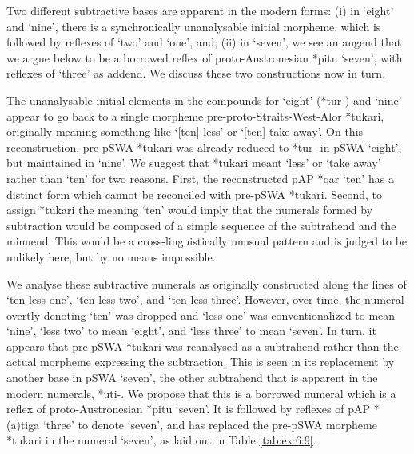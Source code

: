 \let\eachwordone=\it
\let\eachwordtwo=\rm
\let\eachwordthree=\rm
\let\eachwordfour=\rm
\let\eachwordfive=\rm
\let\eachwordsix=\rm
\let\eachwordseven=\rm


Two different subtractive bases are apparent in the modern forms: (i) in `eight' and `nine', there is a synchronically unanalysable initial morpheme, which is followed by reflexes of `two' and `one', and; (ii) in `seven', we see an augend that we argue below to be a borrowed reflex of proto-Austronesian *pitu `seven', with reflexes of `three' as addend. We discuss these two constructions now in turn.

The unanalysable initial elements in the compounds for `eight' (*tur-) and `nine' appear to go back to a single morpheme pre-proto-Straits-West-Alor *tukari, originally meaning something like `[ten] less' or `[ten] take away'. On this reconstruction, pre-pSWA *tukari was already reduced to *tur- in pSWA `eight', but maintained in `nine'. We suggest that *tukari meant `less' or `take away' rather than `ten' for two reasons. First, the reconstructed pAP *qar `ten' \citep{HoltonEtAl2012} has a distinct form which cannot be reconciled with pre-pSWA *tukari. Second, to assign *tukari the meaning `ten' would imply that the numerals formed by subtraction would be composed of a simple sequence of the subtrahend and the minuend. This would be a cross-linguistically unusual pattern and is judged to be unlikely here, but by no means impossible. 

We analyse these subtractive numerals as originally constructed along the lines of `ten less one', `ten less two', and `ten less three'. However, over time, the numeral overtly denoting `ten' was dropped and `less one' was conventionalized to mean `nine', `less two' to mean `eight', and `less three' to mean `seven'. In turn, it appears that pre-pSWA *tukari was reanalysed as a subtrahend rather than the actual morpheme expressing the subtraction. This is seen in its replacement by another base in pSWA `seven', the other subtrahend that is apparent in the modern numerals, *{\texthtb}uti-. We propose that this is a borrowed numeral which is a reflex of proto-Austronesian *pitu `seven'. It is followed by reflexes of pAP *(a)tiga `three' to denote `seven', and has replaced the pre-pSWA morpheme *tukari in the numeral `seven', as laid out in Table \ref{tab:ex:6:9}.


